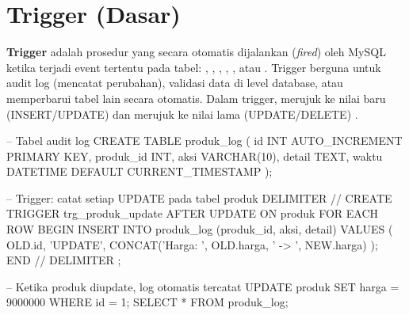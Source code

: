 \section{Trigger (Dasar)}

\textbf{Trigger} adalah prosedur yang secara otomatis dijalankan (\textit{fired}) oleh MySQL ketika terjadi event tertentu pada tabel: , , , , , atau . Trigger berguna untuk audit log (mencatat perubahan), validasi data di level database, atau memperbarui tabel lain secara otomatis. Dalam trigger,  merujuk ke nilai baru (INSERT/UPDATE) dan  merujuk ke nilai lama (UPDATE/DELETE) \cite{mysqlDocs}.

\begin{webcode}[language=SQL, caption={Trigger untuk audit log}]
-- Tabel audit log
CREATE TABLE produk_log (
  id        INT AUTO_INCREMENT PRIMARY KEY,
  produk_id INT, aksi VARCHAR(10),
  detail    TEXT, waktu DATETIME DEFAULT CURRENT_TIMESTAMP
);

-- Trigger: catat setiap UPDATE pada tabel produk
DELIMITER //
CREATE TRIGGER trg_produk_update
AFTER UPDATE ON produk
FOR EACH ROW
BEGIN
  INSERT INTO produk_log (produk_id, aksi, detail) VALUES (
    OLD.id, 'UPDATE',
    CONCAT('Harga: ', OLD.harga, ' -> ', NEW.harga)
  );
END //
DELIMITER ;

-- Ketika produk diupdate, log otomatis tercatat
UPDATE produk SET harga = 9000000 WHERE id = 1;
SELECT * FROM produk_log;
\end{webcode}

